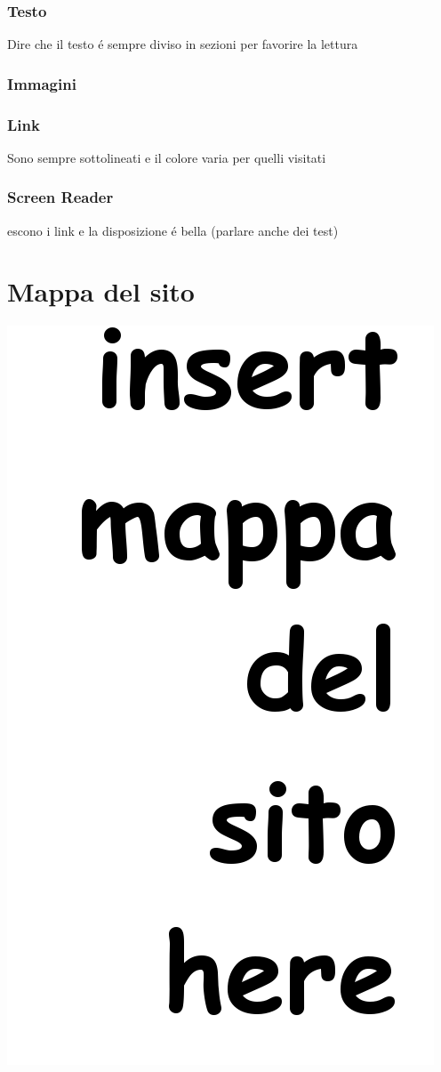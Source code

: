 \documentclass[10pt,a4paper,onecolumn]{article}
\begin{document}
\subsubsection{Testo}

Dire che il testo \'e sempre diviso in sezioni per favorire la lettura

\subsubsection{Immagini}

\subsubsection{Link}

Sono sempre sottolineati e il colore varia per quelli visitati

\subsubsection{Screen Reader}

escono i link e la disposizione \'e bella (parlare anche dei test)

\clearpage
\section{Mappa del sito}
\includegraphics[width=.9\textwidth]{mappasito.png}
\end{document}
